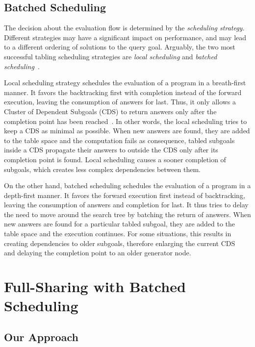 \documentclass{llncs}
\begin{document}
\subsection{Batched Scheduling}

The decision about the evaluation flow is determined by the
\emph{scheduling strategy}. Different strategies may have a
significant impact on performance, and may lead to a different
ordering of solutions to the query goal. Arguably, the two most
successful tabling scheduling strategies are \emph{local scheduling}
and \emph{batched scheduling}~\cite{Freire-96}.

Local scheduling strategy schedules the evaluation of a program in a
breath-first manner. It favors the backtracking first with completion
instead of the forward execution, leaving the consumption of answers
for last. Thus, it only allows a Cluster of Dependent Subgoals (CDS)
to return answers only after the completion point has been
reached~\cite{Freire-96}. In other words, the local scheduling tries
to keep a CDS as minimal as possible. When new answers are found, they
are added to the table space and the computation fails as consequence,
tabled subgoals inside a CDS propagate their answers to outside the
CDS only after its completion point is found. Local scheduling causes
a sooner completion of subgoals, which creates less complex
dependencies between them.

On the other hand, batched scheduling schedules the evaluation of a
program in a depth-first manner. It favors the forward execution first
instead of backtracking, leaving the consumption of answers and
completion for last. It thus tries to delay the need to move around
the search tree by batching the return of answers. When new answers
are found for a particular tabled subgoal, they are added to the table
space and the execution continues. For some situations, this results
in creating dependencies to older subgoals, therefore enlarging the
current CDS~\cite{Sagonas-98} and delaying the completion point to an
older generator node.

\section{Full-Sharing with Batched Scheduling}

\subsection{Our Approach}
\end{document}
